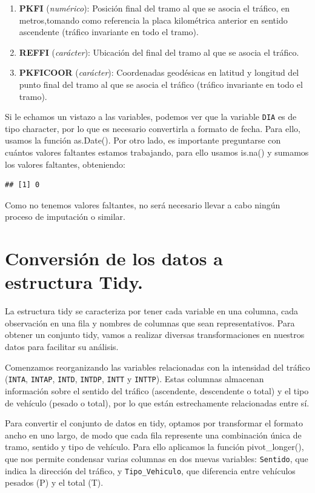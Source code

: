 \documentclass[notspecified,article,submit,moreauthors,pdftex]{Definitions/mdpi}
\begin{document}
\begin{enumerate}
\item \textbf{PKFI} (\textit{numérico}): Posición final del tramo al que se asocia el tráfico, en metros,tomando como referencia la placa kilométrica anterior en sentido ascendente (tráfico invariante en todo el tramo).
\item \textbf{REFFI} (\textit{carácter}): Ubicación del final del tramo al que se asocia el tráfico.
\item \textbf{PKFICOOR} (\textit{carácter}): Coordenadas geodésicas en latitud y longitud del punto final del tramo al que se asocia el tráfico (tráfico invariante en todo el tramo).
\end{enumerate}

Si le echamos un vistazo a las variables, podemos ver que la variable
\texttt{DIA} es de tipo character, por lo que es necesario convertirla a
formato de fecha. Para ello, usamos la función as.Date(). Por otro lado,
es importante preguntarse con cuántos valores faltantes estamos
trabajando, para ello usamos is.na() y sumamos los valores faltantes,
obteniendo:

\begin{verbatim}
## [1] 0
\end{verbatim}

Como no tenemos valores faltantes, no será necesario llevar a cabo
ningún proceso de imputación o similar.

\section{Conversión de los datos a estructura
Tidy.}\label{conversiuxf3n-de-los-datos-a-estructura-tidy.}

La estructura tidy se caracteriza por tener cada variable en una
columna, cada observación en una fila y nombres de columnas que sean
representativos. Para obtener un conjunto tidy, vamos a realizar
diversas transformaciones en nuestros datos para facilitar su análisis.

Comenzamos reorganizando las variables relacionadas con la intensidad
del tráfico (\texttt{INTA}, \texttt{INTAP}, \texttt{INTD},
\texttt{INTDP}, \texttt{INTT} y \texttt{INTTP}). Estas columnas
almacenan información sobre el sentido del tráfico (ascendente,
descendente o total) y el tipo de vehículo (pesado o total), por lo que
están estrechamente relacionadas entre sí.

Para convertir el conjunto de datos en tidy, optamos por transformar el
formato ancho en uno largo, de modo que cada fila represente una
combinación única de tramo, sentido y tipo de vehículo. Para ello
aplicamos la función pivot\_longer(), que nos permite condensar varias
columnas en dos nuevas variables: \texttt{Sentido}, que indica la
dirección del tráfico, y \texttt{Tipo\_Vehiculo}, que diferencia entre
vehículos pesados (P) y el total (T).
\end{document}
